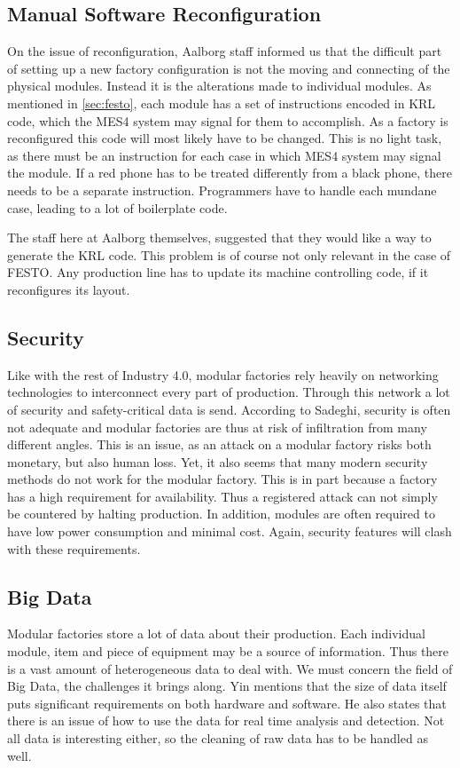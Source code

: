 \subsection{Manual Software Reconfiguration}
On the issue of reconfiguration, Aalborg staff informed us that the difficult part of setting up a new factory configuration is not the moving and connecting of the physical modules. Instead it is the alterations made to individual modules. As mentioned in \cref{sec:festo}, each module has a set of instructions encoded in KRL code, which the MES4 system may signal for them to accomplish. As a factory is reconfigured this code will most likely have to be changed. This is no light task, as there must be an instruction for each case in which MES4 system may signal the module. If a red phone has to be treated differently from a black phone, there needs to be a separate instruction. Programmers have to handle each mundane case, leading to a lot of boilerplate code. 

The staff here at Aalborg themselves, suggested that they would like a way to generate the KRL code. This problem is of course not only relevant in the case of FESTO. Any production line has to update its machine controlling code, if it reconfigures its layout.

\subsection{Security}
Like with the rest of Industry 4.0, modular factories rely heavily on networking technologies to interconnect every part of production. Through this network a lot of security and safety-critical data is send. According to Sadeghi\cite{Sadeghi2015}, security is often not adequate and modular factories are thus at risk of infiltration from many different angles. This is an issue, as an attack on a modular factory risks both monetary, but also human loss. Yet, it also seems that many modern security methods do not work for the modular factory. This is in part because a factory has a high requirement for availability. Thus a registered attack can not simply be countered by halting production. In addition, modules are often required to have low power consumption and minimal cost. Again, security features will clash with these requirements. 

\subsection{Big Data}
Modular factories store a lot of data about their production. Each individual module, item and piece of equipment may be a source of information. Thus there is a vast amount of heterogeneous data to deal with. We must concern the field of Big Data, the challenges it brings along. Yin \cite{Yin2015} mentions that the size of data itself puts significant requirements on both hardware and software. He also states that there is an issue of how to use the data for real time analysis and detection. Not all data is interesting either, so the cleaning of raw data has to be handled as well. 

